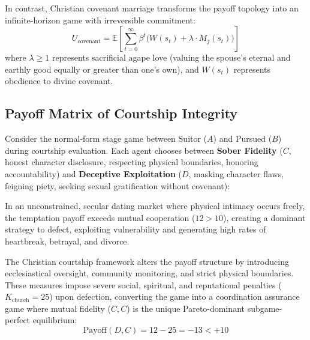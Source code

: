 \documentclass[11pt,twocolumn]{article}
\begin{document}
In contrast, Christian covenant marriage transforms the payoff topology into an infinite-horizon game with irreversible commitment:
\begin{equation}
U_{\text{covenant}} = \mathbb{E} \left[ \sum_{t=0}^{\infty} \beta^t \Big( W(s_t) + \lambda \cdot M_j(s_t) \Big) \right]
\end{equation}
where $\lambda \ge 1$ represents sacrificial agape love (valuing the spouse's eternal and earthly good equally or greater than one's own), and $W(s_t)$ represents obedience to divine covenant.

\subsection{Payoff Matrix of Courtship Integrity}
Consider the normal-form stage game between Suitor ($A$) and Pursued ($B$) during courtship evaluation. Each agent chooses between \textbf{Sober Fidelity} ($C$, honest character disclosure, respecting physical boundaries, honoring accountability) and \textbf{Deceptive Exploitation} ($D$, masking character flaws, feigning piety, seeking sexual gratification without covenant):

\begin{table}[H]
\centering
\caption{Payoff Matrix of Courtship Strategies}
\label{tab:payoff}
\end{table}

In an unconstrained, secular dating market where physical intimacy occurs freely, the temptation payoff exceeds mutual cooperation ($12 > 10$), creating a dominant strategy to defect, exploiting vulnerability and generating high rates of heartbreak, betrayal, and divorce. 

The Christian courtship framework alters the payoff structure by introducing ecclesiastical oversight, community monitoring, and strict physical boundaries. These measures impose severe social, spiritual, and reputational penalties ($K_{\text{church}} = 25$) upon defection, converting the game into a coordination assurance game where mutual fidelity ($C, C$) is the unique Pareto-dominant subgame-perfect equilibrium:
\begin{equation}
\text{Payoff}(D, C) = 12 - 25 = -13 < +10
\end{equation}
\end{document}
